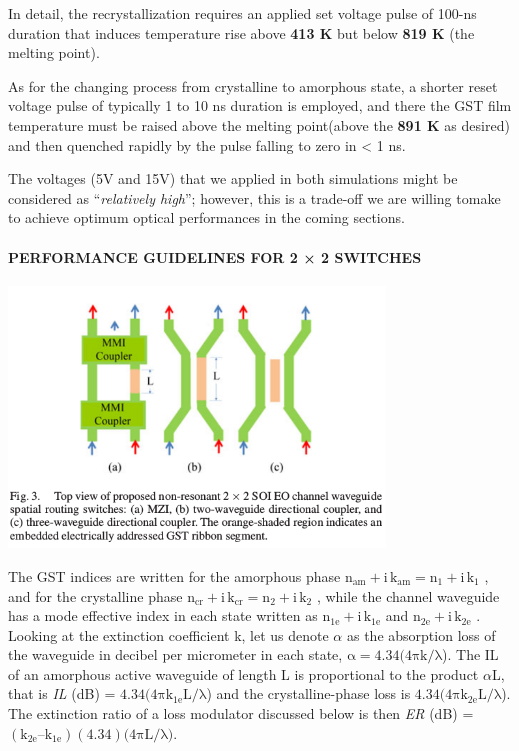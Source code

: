 \documentclass[]{article}
\let\oldparagraph\paragraph
\renewcommand{\paragraph}[1]{\oldparagraph{#1}\mbox{}}
\begin{document}
In detail, the recrystallization requires an applied set voltage pulse
of 100-ns duration that induces temperature rise above \textbf{413 K}
but below \textbf{819 K} (the melting point).

As for the changing process from crystalline to amorphous state, a
shorter reset voltage pulse of typically 1 to 10 ns duration is
employed, and there the GST film temperature must be raised above the
melting point(above the \textbf{891 K} as desired) and then quenched
rapidly by the pulse falling to zero in \textless{} 1 ns.

The voltages (5V and 15V) that we applied in both simulations might be
considered as ``\emph{relatively high}''; however, this is a trade-off
we are willing tomake to achieve optimum optical performances in the
coming sections.

\paragraph{PERFORMANCE GUIDELINES FOR 2 × 2
SWITCHES}\label{performance-guidelines-for-2-2-switches}

\centerline{\includegraphics[width=10cm]{image/004_03.png}}
The GST indices are written for the amorphous phase
\(\mathrm{n_{am} + i\,k_{am} = n_1 + i\,k_1}\) , and for the crystalline
phase \(\mathrm{n_{cr} + i\,k_{cr} = n_2 + i\,k_2}\) , while the channel
waveguide has a mode effective index in each state written as
\(\mathrm{n_{1e} + i\,k_{1e}}\) and \(\mathrm{n_{2e} + i\,k_{2e}}\) .
Looking at the extinction coefficient k, let us denote \(\alpha\) as the
absorption loss of the waveguide in decibel per micrometer in each
state, \(\mathrm{\alpha = 4.34(4\pi k/\lambda}\)). The IL of an
amorphous active waveguide of length L is proportional to the product
\(\alpha\)L, that is \emph{IL} (dB) =
\(\mathrm{4.34(4\pi k_{1e} L/\lambda}\)) and the crystalline-phase loss
is \(\mathrm{4.34(4\pi k_{2e} L/\lambda}\)). The extinction ratio of a
loss modulator discussed below is then \emph{ER} (dB) =
\(\mathrm{(k_{2e} – k_{1e})(4.34)(4\pi L/\lambda})\).
\end{document}
